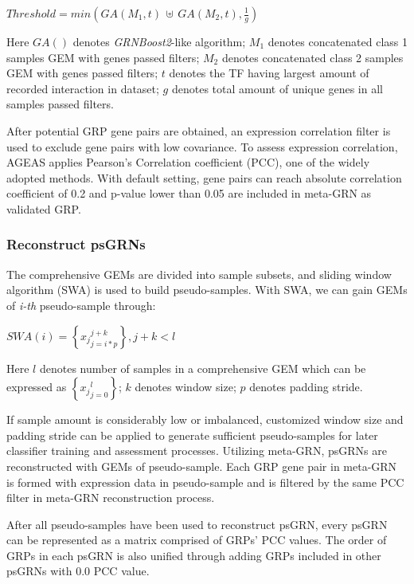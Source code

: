 \documentclass[fleqn,10pt]{wlscirep}
\begin{document}
      \centerline{$Threshold = min(GA(M_1, t)\, \uplus \, GA(M_2, t), \frac{1}{g})$}

      \noindent Here $GA()$ denotes \emph{GRNBoost2}\cite{grnboost2}-like algorithm;
      $M_1$ denotes concatenated class 1 samples GEM with genes passed filters;
      $M_2$ denotes concatenated class 2 samples GEM with genes passed filters;
      $t$ denotes the TF having largest amount of recorded interaction in dataset;
      $g$ denotes total amount of unique genes in all samples passed filters.

      After potential GRP gene pairs are obtained, an expression correlation filter is used to exclude gene pairs with low covariance.
      To assess expression correlation, AGEAS applies Pearson's Correlation coefficient\cite{pcc_2012} (PCC), one of the widely adopted methods.\cite{cid_2019}
      With default setting, gene pairs can reach absolute correlation coefficient of 0.2 and p-value lower than 0.05 are included in meta-GRN as validated GRP.

    \subsubsection*{Reconstruct psGRNs}
      The comprehensive GEMs are divided into sample subsets, and sliding window algorithm (SWA) is used to build pseudo-samples.
      With SWA, we can gain GEMs of \emph{i-th} pseudo-sample through:

      \centerline{$SWA(i) = \left\{{x_j}_{j = i * p}^{j + k}\right\}, j + k < l$}

      \noindent Here $l$ denotes number of samples in a comprehensive GEM which can be expressed as $\left\{{x_j}_{j = 0}^{l}\right\}$; $k$ denotes window size; $p$ denotes padding stride.

      If sample amount is considerably low or imbalanced, customized window size and padding stride can be applied to generate sufficient pseudo-samples for later classifier training and assessment processes.
      Utilizing meta-GRN, psGRNs are reconstructed with GEMs of pseudo-sample.
      Each GRP gene pair in meta-GRN is formed with expression data in pseudo-sample and is filtered by the same PCC filter in meta-GRN reconstruction process.

      After all pseudo-samples have been used to reconstruct psGRN, every psGRN can be represented as a matrix comprised of GRPs' PCC values.
      The order of GRPs in each psGRN is also unified through adding GRPs included in other psGRNs with 0.0 PCC value.
\end{document}
